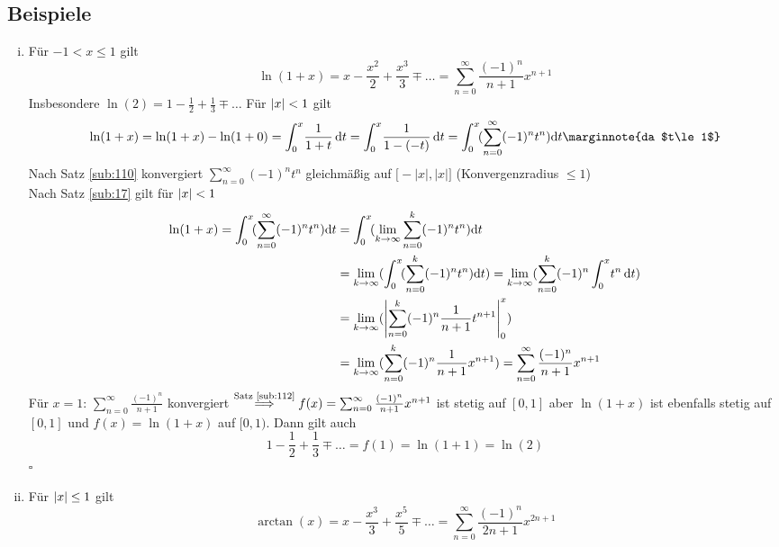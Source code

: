 \subsection[Beispiele für die Anwendung des Abelschen Grenzwertsatzes]{Beispiele} %
\label{sub:113}
\begin{enumerate}[(i)]
	\item Für $-1 < x \le 1$ gilt 
	\[
		\ln (1+x) = x - \frac{x^2}{2} + \frac{x^3}{3} \mp \ldots  = \sum_{n=0}^{\infty} \frac{(-1)^n}{n+1} x^{n+1}   
	\]
	Insbesondere $\ln (2) = 1- \frac{1}{2} + \frac{1}{3} \mp \ldots   $
	Für $\lvert x\rvert<1 $ gilt 
	\begin{align*}
		\ln (1+x) = \ln (1+x) - \ln(1+0) = \int_{0} ^{x} \! \frac{1}{1+t}  \, \mathrm{d}t = \int_{0} ^{x} \! \frac{1}{1-(-t)}  \, \mathrm{d}t  = \int_{0} ^{x} \! 
		\enbrace{\sum_{n=0}^{\infty} (-1)^n t^n} \mathrm{d}t \marginnote{da $t\le 1$}
	\end{align*}
	Nach Satz \ref{sub:110} konvergiert $\sum_{n=0}^{\infty} (-1)^n t^n$ gleichmäßig auf $\big[-|x| , |x|\big]$ { \footnotesize (Konvergenzradius $\le 1$)} \\
	Nach Satz \ref{sub:17} gilt für $\lvert x\rvert <1 $
	\begin{align*}
		\ln(1+x) = \int_{0} ^{x} \! (\sum_{n=0}^{\infty} (-1)^n t^n)  \mathrm{d}t  &= \int_{0} ^{x} \! (\lim\limits_{ k \to \infty} \sum_{n=0}^{k}
		(-1)^n t^n ) \mathrm{d}t  \\
		&= \lim\limits_{ k \to \infty} (\int_{0} ^{x} \!  (\sum_{n=0}^{k} (-1)^n t^n)  \mathrm{d}t )  = \lim\limits_{ k \to \infty} 
		(\sum_{n=0}^{k} (-1)^n \int_{0} ^{x} \! t^n  \, \mathrm{d}t) \\
		&= \lim\limits_{ k \to \infty} (\left| \sum_{n=0}^{k} (-1)^n \frac{1}{n+1} t^{n+1} \right|_0^x )  \\
		&= \lim\limits_{ k \to \infty} (\sum_{n=0}^{k} (-1)^n \frac{1}{n+1} x^{n+1} ) = \sum_{n=0}^{\infty} \frac{(-1)^n}{n+1} x^{n+1}  
	\end{align*}
	Für $x=1$: $\sum_{n=0}^{\infty} \frac{(-1)^n}{n+1} $ konvergiert $\overset{\text{Satz \ref{sub:112}}}{\Longrightarrow} 
	f(x) = \sum_{n=0}^{\infty} \frac{(-1)^n}{n+1} x^{n+1}$ ist stetig auf $[0,1]$ aber $\ln(1+x)$ ist ebenfalls stetig auf $[0,1]$ und $f(x)= \ln(1+x)$ auf $[0,1)$.
	Dann gilt auch 
	\[
		1- \frac{1}{2}  + \frac{1}{3} \mp \ldots =f(1)= \ln (1+1) = \ln (2)
	\]
	\hfill \( \square \)
	\item Für $\lvert x\rvert \le 1 $ gilt 
	\[
		\arctan (x) = x - \frac{x^3}{3} + \frac{x^5}{5} \mp \ldots = \sum_{n=0}^{\infty} \frac{(-1)^n}{2n+1} x^{2n+1}   
\]
\end{enumerate}
